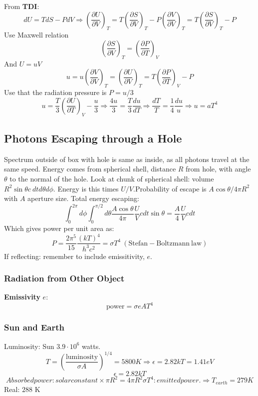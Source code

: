 \documentclass[a4paper,norsk, 10pt]{article}
\newcommand{\pd}[3]{\left(\frac{\partial #1}{\partial #2}\right)_{#3}}
\begin{document}
From \textbf{TDI}:
\begin{equation}
dU = TdS - PdV \Rightarrow \pd{U}{V}{T} = T\pd{S}{V}{T} - P\pd{V}{V}{T} = T\pd{S}{V}{T} - P
\end{equation}
Use Maxwell relation
\begin{equation}
\pd{S}{V}{T} = \pd{P}{T}{V}
\end{equation}
And $U = uV$
\begin{equation}
u = u \pd{V}{V}{T} = \pd{U}{V}{T} = T\pd{P}{T}{V} - P
\end{equation}
Use that the radiation pressure is $P = u/3$
\begin{equation}
u = \frac{T}{3}\pd{U}{T}{V} - \frac{u}{3} \Rightarrow \frac{4u}{3} = \frac{T}{3}\frac{du}{dT} \Rightarrow\frac{dT}{T} = \frac{1}{4}\frac{du}{u}\Rightarrow u = aT^4
\end{equation}
\subsection{Photons Escaping through a Hole}
Spectrum outside of box with hole is same as inside, as all photons travel at the same speed. Energy comes from spherical shell, distance $R$ from hole, with angle $\theta$ to the normal of the hole. Look at chunk of spherical shell: volume $R^2 \sin \theta c\ dt d\theta d\phi$. Energy is this times $U/V$.Probability of escape is $A\cos \theta/4\pi R^2$ with $A$ aperture size. Total energy escaping:
\begin{equation}
\int_0^{2\pi}d\phi \int_0^{\pi/2} d\theta \frac{A\cos \theta}{4\pi}\frac{U}{V}cdt\sin \theta = \frac{A}{4}\frac{U}{V}cdt
\end{equation}
Which gives power per unit area as:
\begin{equation}
P=\frac{2\pi^5}{15}\frac{\left(kT\right)^4}{h^3c^2}=\sigma T^4 \ \mathrm{(Stefan-Boltzmann\ law)}
\end{equation}
If reflecting: remember to include emissitivity, $e$.


\subsubsection{Radiation from Other Object}
\textbf{Emissivity} $e$:
\begin{equation}
\text{power} = \sigma e A T^4
\end{equation}
\subsubsection{Sun and Earth}
Luminosity: Sun $3.9\cdot 10^{6}$ watts.
\begin{equation}
T = \left(\frac{\text{luminosity}}{\sigma A}\right)^{1/4} = 5800 K \Rightarrow\epsilon = 2.82kT = 1.41 eV
\end{equation}
\begin{equation}
\epsilon = 2.82kT
\end{equation}
\begin{equation}
Absorbed power: solar constant\times \pi R^2= 4\pi R^2\sigma T^4 : emitted power. \Rightarrow T_{earth} = 279 K
\end{equation}
Real: $288$ K
\end{document}
